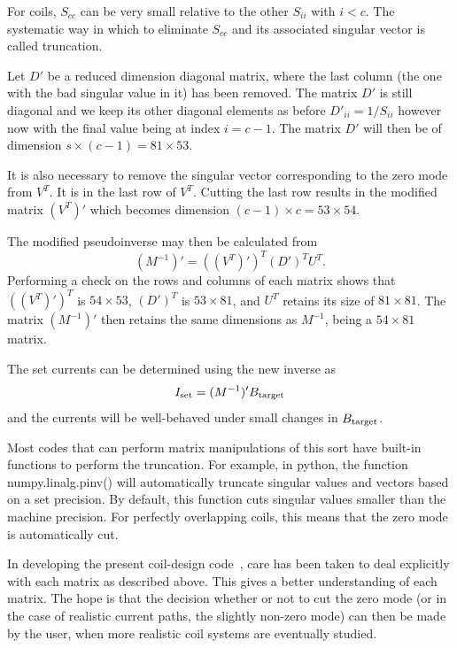 \documentclass[preprint,12pt]{elsarticle}
\begin{document}
For coils, $S_{cc}$ can be very small relative to the other $S_{ii}$
with $i<c$.  The systematic way in which to eliminate $S_{cc}$ and its
associated singular vector is called truncation.

Let $D'$ be a reduced dimension diagonal matrix, where the last column
(the one with the bad singular value in it) has been removed.  The
matrix $D'$ is still diagonal and we keep its other diagonal elements
as before $D'_{ii}=1/S_{ii}$ however now with the final value being at
index $i=c-1$.  The matrix $D'$ will then be of dimension
$s\times(c-1)=81\times 53$.

It is also necessary to remove the singular vector corresponding to
the zero mode from $V^T$.  It is in the last row of $V^T$.  Cutting
the last row results in the modified matrix $(V^T)'$ which becomes
dimension $(c-1)\times c=53\times 54$.

The modified pseudoinverse may then be calculated from
\begin{equation}
  (M^{-1})'=((V^T)')^T(D')^TU^T.
\end{equation}
Performing a check on the rows and columns of each matrix shows that
$((V^T)')^T$ is $54\times 53$, $(D')^T$ is $53\times 81$, and $U^T$
retains its size of $81\times 81$.  The matrix $(M^{-1})'$ then retains
the same dimensions as $M^{-1}$, being a $54\times 81$ matrix.

The set currents can be determined using the new inverse as
\begin{equation}
  I_{\rm set}=(M^{-1})'B_{\rm target}
\end{equation}
and the currents will be well-behaved under small changes in $B_{\rm
  target}$.

Most codes that can perform matrix manipulations of this sort have
built-in functions to perform the truncation.  For example, in python,
the function numpy.linalg.pinv() will automatically truncate singular
values and vectors based on a set precision.  By default, this
function cuts singular values smaller than the machine precision.  For
perfectly overlapping coils, this means that the zero mode is
automatically cut.

In developing the present coil-design code~\cite{bib:code}, care has
been taken to deal explicitly with each matrix as described above.
This gives a better understanding of each matrix.  The hope is that
the decision whether or not to cut the zero mode (or in the case of
realistic current paths, the slightly non-zero mode) can then be made
by the user, when more realistic coil systems are eventually studied.
\end{document}
